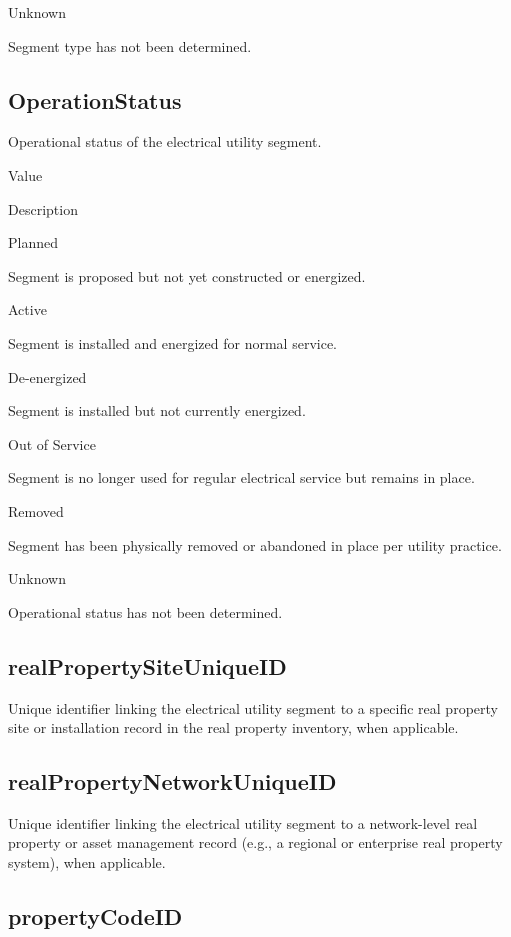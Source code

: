 \documentclass[
  letterpaper,
  DIV=11,
  numbers=noendperiod]{scrreprt}
\begin{document}
Unknown

Segment type has not been determined.

\subsection{OperationStatus}\label{operationstatus-1}

Operational status of the electrical utility segment.

Value

Description

Planned

Segment is proposed but not yet constructed or energized.

Active

Segment is installed and energized for normal service.

De-energized

Segment is installed but not currently energized.

Out of Service

Segment is no longer used for regular electrical service but remains in
place.

Removed

Segment has been physically removed or abandoned in place per utility
practice.

Unknown

Operational status has not been determined.

\subsection{realPropertySiteUniqueID}\label{realpropertysiteuniqueid-1}

Unique identifier linking the electrical utility segment to a specific
real property site or installation record in the real property
inventory, when applicable.

\subsection{realPropertyNetworkUniqueID}\label{realpropertynetworkuniqueid-1}

Unique identifier linking the electrical utility segment to a
network-level real property or asset management record (e.g., a regional
or enterprise real property system), when applicable.

\subsection{propertyCodeID}\label{propertycodeid-1}
\end{document}
